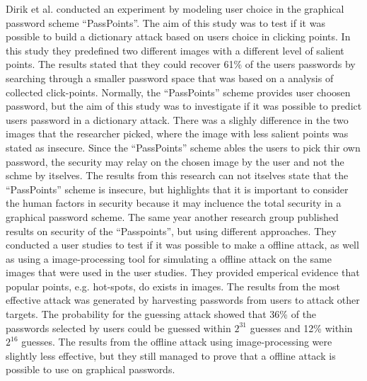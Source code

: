   Dirik et al. \cite{Dirik} conducted an experiment by modeling user choice in the graphical password scheme ``PassPoints''. The aim of this study was to test if it was possible to build a dictionary attack based on users choice in clicking points. In this study they predefined two different images with a different level of salient points. The results stated that they could recover 61\% of the users passwords by searching through a smaller password space that was based on a analysis of collected click-points. Normally, the ``PassPoints'' scheme provides user choosen password, but the aim of this study was to investigate if it was possible to predict users password in a dictionary attack. There was a slighly difference in the two images that the researcher picked, where the image with less salient points was stated as insecure. Since the ``PassPoints'' scheme ables the users to pick thir own password, the security may relay on the chosen image by the user and not the schme by itselves. The results from this research can not itselves state that the ``PassPoints'' scheme is insecure, but highlights that it is important to consider the human factors in security because it may incluence the total security in a graphical password scheme. 
  The same year another research group published \cite{Thorpe2} results on security of the ``Passpoints'', but using different approaches. They conducted a user studies to test if it was possible to make a offline attack, as well as using a image-processing tool for simulating a offline attack on the same images that were used in the user studies. They provided emperical evidence that popular points, e.g. hot-spots, do exists in images. The results from the most effective attack was generated by harvesting passwords from users to attack other targets. The probability for the guessing attack showed that 36\% of the passwords selected by users could be guessed within $2^{31}$ guesses and 12\% within $2^{16}$ guesses. The results from the offline attack using image-processing were slightly less effective, but they still managed to prove that a offline attack is possible to use on graphical passwords.   



